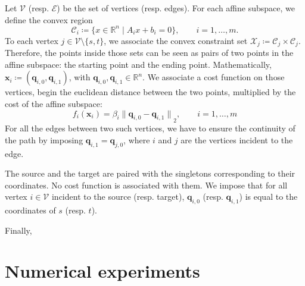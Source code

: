 \documentclass[a4paper, 12pt]{article}
\begin{document}
Let $\mathcal{V}$ (resp. $\mathcal{E}$) be the set of vertices (resp. edges). For each affine subspace, we define the convex region \[\mathcal{C}_i \coloneq \{x \in \mathbb{R}^n \mid A_i x + b_i = 0\}, \qquad i = 1, \dots, m.\]
To each vertex $j \in \mathcal{V}\setminus\{s, t\}$, we associate the convex constraint set $\mathcal{X}_j \coloneq \mathcal{C}_j \times \mathcal{C}_j$. Therefore, the points inside those sets can be seen as pairs of two points in the affine subspace: the starting point and the ending point. Mathematically, $\mathbf{x}_i \coloneq (\mathbf{q}_{i,0}, \mathbf{q}_{i,1})$, with $\mathbf{q}_{i,0}, \mathbf{q}_{i,1} \in \mathbb{R}^n$. We associate a cost function on those vertices, begin the euclidean distance between the two points, multiplied by the cost of the affine subspace: \[f_i(\mathbf{x}_i) = \beta_i {\lVert \mathbf{q}_{i,0} - \mathbf{q}_{i,1} \rVert}_2, \qquad i = 1, \dots, m\]
For all the edges between two such vertices, we have to ensure the continuity of the path by imposing $\mathbf{q}_{i,1} = \mathbf{q}_{j,0}$, where $i$ and $j$ are the vertices incident to the edge.

The source and the target are paired with the singletons corresponding to their coordinates. No cost function is associated with them. We impose that for all vertex $i \in \mathcal{V}$ incident to the source (resp. target), $\mathbf{q}_{i,0}$ (resp. $\mathbf{q}_{i,1}$) is equal to the coordinates of $s$ (resp. $t$).

Finally, 

\section{Numerical experiments}\label{sec:experiments}

\printbibliography{}
\end{document}
